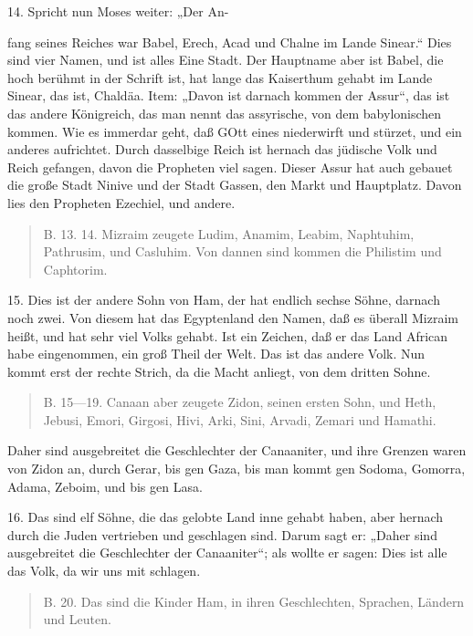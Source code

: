 14. Spricht nun Moses weiter: „Der An-

fang seines Reiches war Babel, Erech, Acad und Chalne im Lande Sinear.“ Dies sind vier Namen, und ist alles Eine Stadt. Der Hauptname aber ist Babel, die hoch berühmt in der Schrift ist, hat lange das Kaiserthum gehabt im Lande Sinear, das ist, Chaldäa. Item: „Davon ist darnach kommen der Assur“, das ist das andere Königreich, das man nennt das assyrische, von dem babylonischen kommen. Wie es immerdar geht, daß GOtt eines niederwirft und stürzet, und ein anderes aufrichtet. Durch dasselbige Reich ist hernach das jüdische Volk und Reich gefangen, davon die Propheten viel sagen. Dieser Assur hat auch gebauet die große Stadt Ninive und der Stadt Gassen, den Markt und Hauptplatz. Davon lies den Propheten Ezechiel, und andere.

\begin{quote}
B. 13. 14. Mizraim zeugete Ludim, Anamim, Leabim, Naphtuhim, Pathrusim, und Casluhim. Von dannen sind kommen die Philistim und Caphtorim.
\end{quote}

15. Dies ist der andere Sohn von Ham, der hat endlich sechse Söhne, darnach noch zwei. Von diesem hat das Egyptenland den Namen, daß es überall Mizraim heißt, und hat sehr viel Volks gehabt. Ist ein Zeichen, daß er das Land African habe eingenommen, ein groß Theil der Welt. Das ist das andere Volk. Nun kommt erst der rechte Strich, da die Macht anliegt, von dem dritten Sohne.

\begin{quote}
B. 15—19. Canaan aber zeugete Zidon, seinen ersten Sohn, und Heth, Jebusi, Emori, Girgosi, Hivi, Arki, Sini, Arvadi, Zemari und Hamathi.
\end{quote}

Daher sind ausgebreitet die Geschlechter der Canaaniter, und ihre Grenzen waren von Zidon an, durch Gerar, bis gen Gaza, bis man kommt gen Sodoma, Gomorra, Adama, Zeboim, und bis gen Lasa.

16. Das sind elf Söhne, die das gelobte Land inne gehabt haben, aber hernach durch die Juden vertrieben und geschlagen sind. Darum sagt er: „Daher sind ausgebreitet die Geschlechter der Canaaniter“; als wollte er sagen: Dies ist alle das Volk, da wir uns mit schlagen.

\begin{quote}
B. 20. Das sind die Kinder Ham, in ihren Geschlechten, Sprachen, Ländern und Leuten.
\end{quote}

